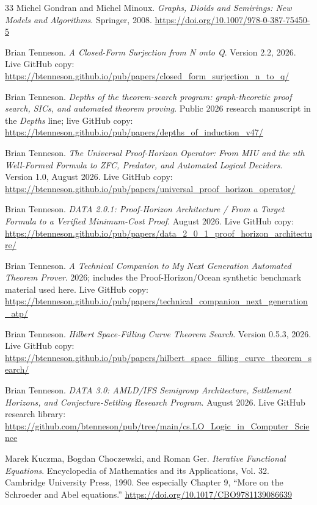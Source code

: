 \begin{thebibliography}{33}
Michel Gondran and Michel Minoux.
\emph{Graphs, Dioids and Semirings: New Models and Algorithms}.
Springer, 2008.
\url{https://doi.org/10.1007/978-0-387-75450-5}

Brian Tenneson.
\emph{A Closed-Form Surjection from N onto Q}.
Version 2.2, 2026. Live GitHub copy:
\url{https://btenneson.github.io/pub/papers/closed_form_surjection_n_to_q/}

Brian Tenneson.
\emph{Depths of the theorem-search program: graph-theoretic proof search, SICs, and automated theorem proving}.
Public 2026 research manuscript in the \emph{Depths} line; live GitHub copy:
\url{https://btenneson.github.io/pub/papers/depths_of_induction_v47/}

Brian Tenneson.
\emph{The Universal Proof-Horizon Operator: From MIU and the nth Well-Formed Formula to ZFC, Predator, and Automated Logical Deciders}.
Version 1.0, August 2026. Live GitHub copy:
\url{https://btenneson.github.io/pub/papers/universal_proof_horizon_operator/}

Brian Tenneson.
\emph{DATA 2.0.1: Proof-Horizon Architecture / From a Target Formula to a Verified Minimum-Cost Proof}.
August 2026. Live GitHub copy:
\url{https://btenneson.github.io/pub/papers/data_2_0_1_proof_horizon_architecture/}

Brian Tenneson.
\emph{A Technical Companion to My Next Generation Automated Theorem Prover}.
2026; includes the Proof-Horizon/Ocean synthetic benchmark material used here. Live GitHub copy:
\url{https://btenneson.github.io/pub/papers/technical_companion_next_generation_atp/}

Brian Tenneson.
\emph{Hilbert Space-Filling Curve Theorem Search}.
Version 0.5.3, 2026. Live GitHub copy:
\url{https://btenneson.github.io/pub/papers/hilbert_space_filling_curve_theorem_search/}

Brian Tenneson.
\emph{DATA 3.0: AMLD/IFS Semigroup Architecture, Settlement Horizons, and Conjecture-Settling Research Program}.
August 2026. Live GitHub research library:
\url{https://github.com/btenneson/pub/tree/main/cs.LO_Logic_in_Computer_Science}

Marek Kuczma, Bogdan Choczewski, and Roman Ger.
\emph{Iterative Functional Equations}.
Encyclopedia of Mathematics and its Applications, Vol. 32. Cambridge University Press, 1990.
See especially Chapter 9, ``More on the Schroeder and Abel equations.''
\url{https://doi.org/10.1017/CBO9781139086639}


\end{thebibliography}
